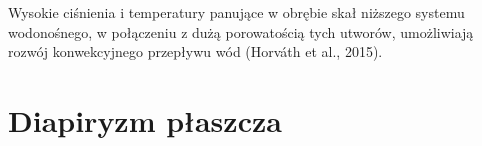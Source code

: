 \documentclass[11.5pt,twoside]{report}
\begin{document}
 Wysokie ciśnienia i temperatury panujące w obrębie skał niższego systemu wodonośnego, w połączeniu z dużą porowatością tych utworów, umożliwiają rozwój konwekcyjnego przepływu wód (Horv\'{a}th et al., 2015). 
 
 
 
 
 
 
 

%

	\section{Diapiryzm płaszcza}

\end{document}
